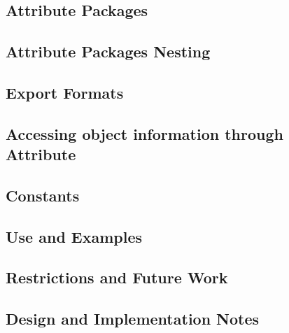 \documentclass[english]{article}
\begin{document}
\subsection{Attribute Packages}

\subsection{Attribute Packages Nesting}

\subsection{Export Formats}

\subsection{Accessing object information through Attribute}

\subsection{Constants}

\subsection{Use and Examples}











\subsection{Restrictions and Future Work}

\subsection{Design and Implementation Notes}

\end{document}
